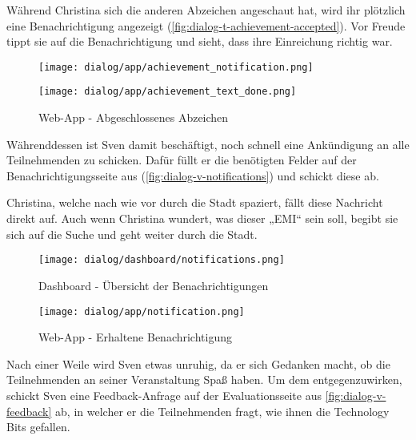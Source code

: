 Während Christina sich die anderen Abzeichen angeschaut hat, wird ihr plötzlich
eine Benachrichtigung angezeigt (\autoref{fig:dialog-t-achievement-accepted}). Vor Freude tippt sie auf die
Benachrichtigung und sieht, dass ihre Einreichung richtig war.

\begin{figure}[htpb]
    \centering
    \begin{minipage}{.5\textwidth}
        \centering
        \texttt{[image: dialog/app/achievement\_notification.png]}
    \end{minipage}%
    \begin{minipage}{.5\textwidth}
        \centering
        \texttt{[image: dialog/app/achievement\_text\_done.png]}
    \end{minipage}
    \caption{Web-App - Abgeschlossenes Abzeichen}
    \label{fig:dialog-t-achievement-accepted}
\end{figure}

Währenddessen ist Sven damit beschäftigt, noch schnell eine Ankündigung an alle
Teilnehmenden zu schicken. Dafür füllt er die benötigten Felder auf der
Benachrichtigungsseite aus (\autoref{fig:dialog-v-notifications}) und schickt
diese ab.

Christina, welche nach wie vor durch die Stadt spaziert, fällt diese Nachricht
direkt auf. Auch wenn Christina wundert, was dieser „EMI“ sein soll, begibt sie
sich auf die Suche und geht weiter durch die Stadt.

\begin{figure}[htpb]
    \centering
    \texttt{[image: dialog/dashboard/notifications.png]}
    \caption{Dashboard - Übersicht der Benachrichtigungen}
    \label{fig:dialog-v-notifications}
\end{figure}

\begin{figure}[htpb]
    \centering
    \texttt{[image: dialog/app/notification.png]}
    \caption{Web-App - Erhaltene Benachrichtigung}
    \label{fig:dialog-t-notification}
\end{figure}

Nach einer Weile wird Sven etwas unruhig, da er sich Gedanken macht, ob die
Teilnehmenden an seiner Veranstaltung Spaß haben. Um dem entgegenzuwirken,
schickt Sven eine Feedback-Anfrage auf der Evaluationsseite aus
\autoref{fig:dialog-v-feedback} ab, in welcher er die Teilnehmenden fragt, wie
ihnen die Technology Bits gefallen.

